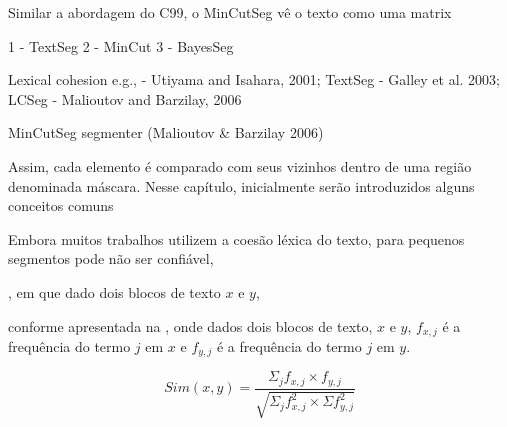  





















Similar a abordagem do C99, o MinCutSeg vê o texto como uma matrix 
















1 - TextSeg
2 - MinCut
3 - BayesSeg


Lexical cohesion e.g., 
	- Utiyama and Isahara,     2001; {TextSeg}
	- Galley et al.            2003; {LCSeg}
	- Malioutov and Barzilay,  2006  {}








MinCutSeg segmenter (Malioutov & Barzilay 2006)




Assim, cada elemento é comparado com seus vizinhos dentro de uma região denominada máscara.
Nesse capítulo, inicialmente serão introduzidos alguns conceitos comuns 



Embora muitos trabalhos utilizem a coesão léxica do texto, para pequenos segmentos pode não ser confiável,





, em que dado dois blocos de texto $x$ e $y$,

conforme apresentada na , onde dados dois blocos de texto, $x$ e $y$, $f_{x,j}$ é a frequência do termo $j$ em $x$ e $f_{y,j}$ é a frequência do termo $j$ em $y$.

\begin{equation}
	Sim(x,y) = \frac
	{\Sigma_j f_{x,j} \times f_{y,j}}
	{\sqrt{\Sigma_j f^2_{x,j} \times \Sigma f^2_{y,j}}}
	\label{equ:cosine}
\end{equation}




